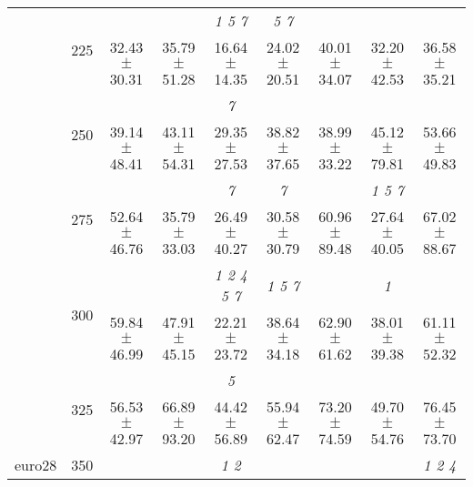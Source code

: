 \begin{table}[h]
{\begin{tabular}{
        ccccccccc}
 & \multirow{2}{*}{225}& \cellcolor[HTML]{EFEFEF} & \cellcolor[HTML]{EFEFEF} & \cellcolor[HTML]{EFEFEF} \textit{ 1 5 7 }& \cellcolor[HTML]{EFEFEF} \textit{ 5 7 }& \cellcolor[HTML]{EFEFEF} & \cellcolor[HTML]{EFEFEF} & \cellcolor[HTML]{EFEFEF}  \\ 
 & & \cellcolor[HTML]{EFEFEF} 32.43 $\pm$ 30.31& \cellcolor[HTML]{EFEFEF} 35.79 $\pm$ 51.28& \cellcolor[HTML]{EFEFEF} 16.64 $\pm$ 14.35& \cellcolor[HTML]{EFEFEF} 24.02 $\pm$ 20.51& \cellcolor[HTML]{EFEFEF} 40.01 $\pm$ 34.07& \cellcolor[HTML]{EFEFEF} 32.20 $\pm$ 42.53& \cellcolor[HTML]{EFEFEF} 36.58 $\pm$ 35.21 \\ 
 & \multirow{2}{*}{250}& & & \textit{ 7 }& & & &  \\ 
 & & 39.14 $\pm$ 48.41& 43.11 $\pm$ 54.31& 29.35 $\pm$ 27.53& 38.82 $\pm$ 37.65& 38.99 $\pm$ 33.22& 45.12 $\pm$ 79.81& 53.66 $\pm$ 49.83 \\ 
 & \multirow{2}{*}{275}& \cellcolor[HTML]{EFEFEF} & \cellcolor[HTML]{EFEFEF} & \cellcolor[HTML]{EFEFEF} \textit{ 7 }& \cellcolor[HTML]{EFEFEF} \textit{ 7 }& \cellcolor[HTML]{EFEFEF} & \cellcolor[HTML]{EFEFEF} \textit{ 1 5 7 }& \cellcolor[HTML]{EFEFEF}  \\ 
 & & \cellcolor[HTML]{EFEFEF} 52.64 $\pm$ 46.76& \cellcolor[HTML]{EFEFEF} 35.79 $\pm$ 33.03& \cellcolor[HTML]{EFEFEF} 26.49 $\pm$ 40.27& \cellcolor[HTML]{EFEFEF} 30.58 $\pm$ 30.79& \cellcolor[HTML]{EFEFEF} 60.96 $\pm$ 89.48& \cellcolor[HTML]{EFEFEF} 27.64 $\pm$ 40.05& \cellcolor[HTML]{EFEFEF} 67.02 $\pm$ 88.67 \\ 
 & \multirow{2}{*}{300}& & & \textit{ 1 2 4 5 7 }& \textit{ 1 5 7 }& & \textit{ 1 }&  \\ 
 & & 59.84 $\pm$ 46.99& 47.91 $\pm$ 45.15& 22.21 $\pm$ 23.72& 38.64 $\pm$ 34.18& 62.90 $\pm$ 61.62& 38.01 $\pm$ 39.38& 61.11 $\pm$ 52.32 \\ 
 & \multirow{2}{*}{325}& \cellcolor[HTML]{EFEFEF} & \cellcolor[HTML]{EFEFEF} & \cellcolor[HTML]{EFEFEF} \textit{ 5 }& \cellcolor[HTML]{EFEFEF} & \cellcolor[HTML]{EFEFEF} & \cellcolor[HTML]{EFEFEF} & \cellcolor[HTML]{EFEFEF}  \\ 
 & & \cellcolor[HTML]{EFEFEF} 56.53 $\pm$ 42.97& \cellcolor[HTML]{EFEFEF} 66.89 $\pm$ 93.20& \cellcolor[HTML]{EFEFEF} 44.42 $\pm$ 56.89& \cellcolor[HTML]{EFEFEF} 55.94 $\pm$ 62.47& \cellcolor[HTML]{EFEFEF} 73.20 $\pm$ 74.59& \cellcolor[HTML]{EFEFEF} 49.70 $\pm$ 54.76& \cellcolor[HTML]{EFEFEF} 76.45 $\pm$ 73.70 \\ 
 \multirow{4}{*}{euro28} & \multirow{2}{*}{350}& & & \textit{ 1 2 }& & & & \textit{ 1 2 4 } \\ 

\end{tabular}}
\end{table}
